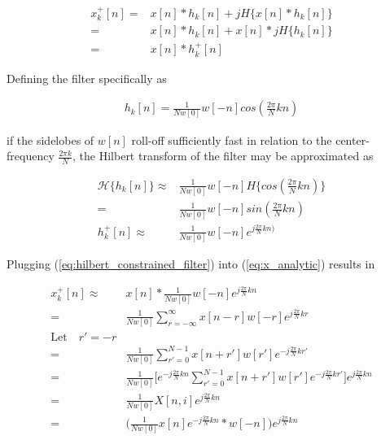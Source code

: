 \documentclass [11pt, proquest,oneside] {ganter_thesis}[2015/03/03]
\begin{document}
\begin{align}
\label{eq:x_analytic}
x^+_k[n] =& x[n] * h_k[n] + jH\{x[n] * h_k[n]\} \nonumber \\
=& x[n] * h_k[n] + x[n] * jH\{h_k[n]\} \nonumber \\
=& x[n] * h^+_k[n]
\end{align}

Defining the filter specifically as

\begin{align}
h_k[n] = \frac{1}{Nw[0]}w[-n]cos(\frac{2\pi}{N}kn)
\end{align}

if the sidelobes of $w[n]$ roll-off sufficiently fast in relation to the center-frequency $\frac{2\pi k}{N}$, the Hilbert transform of the filter may be approximated as

\begin{align}
\mathcal{H}\{h_k[n]\} \approx& \frac{1}{Nw[0]}w[-n] H\{cos(\frac{2\pi}{N}kn)\} \nonumber \\
=& \frac{1}{Nw[0]}w[-n]sin(\frac{2\pi}{N}kn) \\
\label{eq:hilbert_constrained_filter}
h^+_k[n] \approx& \frac{1}{Nw[0]}w[-n]e^{j\frac{2\pi}{N}kn)}
\end{align}


Plugging (\ref{eq:hilbert_constrained_filter}) into (\ref{eq:x_analytic}) results in

\begin{align}
x^+_k[n] \approx& x[n] * \frac{1}{Nw[0]}w[-n]e^{j\frac{2\pi}{N}kn} \nonumber \\
=& \frac{1}{Nw[0]}\sum\limits_{r=-\infty}^{\infty}x[n - r] w[-r] e^{j\frac{2\pi}{N}kr} \nonumber \\
\textrm{Let} \quad r' = -r \nonumber \\
=& \frac{1}{Nw[0]}\sum\limits_{r'=0}^{N-1} x[n + r'] w[r'] e^{-j\frac{2\pi}{N}kr'} \nonumber \\
=& \frac{1}{Nw[0]}\bigg[e^{-j\frac{2\pi}{N}kn} \sum\limits_{r'=0}^{N-1} x[n + r'] w[r'] e^{-j\frac{2\pi}{N}kr'}\bigg]e^{j\frac{2\pi}{N}kn} \nonumber \\
=& \frac{1}{Nw[0]}X[n,i]e^{j\frac{2\pi}{N}kn} \nonumber \\
=& \Bigg( \frac{1}{Nw[0]}  x[n] e^{-j\frac{2\pi}{N}kn} * w[-n] \Bigg) e^{j\frac{2\pi}{N}kn}
\end{align}
\end{document}
